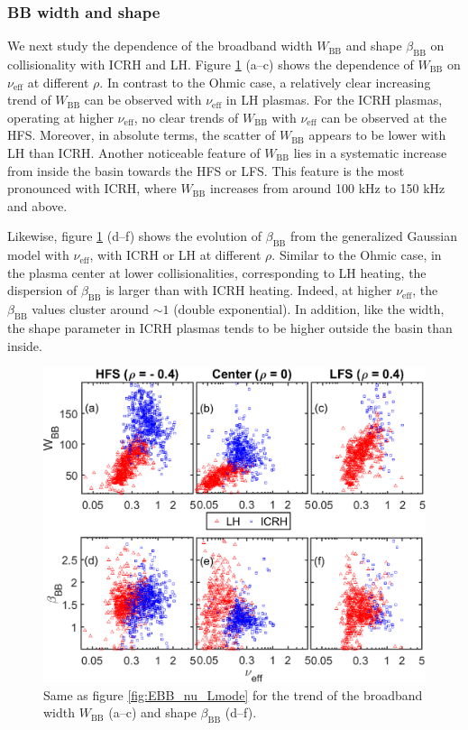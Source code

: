 \subsubsection{BB width and shape}

We next study the dependence of the broadband width $W_\mathrm{BB}$ and shape $\beta_\mathrm{BB}$ on collisionality with ICRH and LH. Figure \ref{fig:WBB_nu_Lmode} (a--c) shows the dependence of $W_\mathrm{BB}$ on $\nu_\mathrm{eff}$ at different $\rho$. In contrast to the Ohmic case, a relatively clear increasing trend of $W_\mathrm{BB}$ can be observed with $\nu_\mathrm{eff}$ in LH plasmas. For the ICRH plasmas, operating at higher $\nu_\mathrm{eff}$, no clear trends of $W_\mathrm{BB}$ with $\nu_\mathrm{eff}$ can be observed at the HFS. Moreover, in absolute terms, the scatter of $W_\mathrm{BB}$ appears to be lower with LH than ICRH. Another noticeable feature of $W_\mathrm{BB}$ lies in a systematic increase from inside the basin towards the HFS or LFS. This feature is the most pronounced with ICRH, where $W_\mathrm{BB}$ increases from around 100 kHz to 150 kHz and above.

Likewise, figure \ref{fig:WBB_nu_Lmode} (d--f) shows the evolution of $\beta_\mathrm{BB}$ from the generalized Gaussian model with $\nu_\mathrm{eff}$, with ICRH or LH at different $\rho$. Similar to the Ohmic case, in the plasma center at lower collisionalities, corresponding to LH heating, the dispersion of $\beta_\mathrm{BB}$ is larger than with ICRH heating. Indeed, at higher $\nu_\mathrm{eff}$, the $\beta_\mathrm{BB}$ values cluster around $\sim 1$ (double exponential). In addition, like the width, the shape parameter in ICRH plasmas tends to be higher outside the basin than inside.


\begin{figure}[h]
\begin{centering}
\includegraphics[scale=0.7]{fig_WBB_betaBB_nu_Lmode.eps}
\par\end{centering}
\caption{Same as figure \ref{fig:EBB_nu_Lmode} for the trend of the broadband width $W_\mathrm{BB}$ (a--c) and shape $\beta_\mathrm{BB}$ (d--f).}
\label{fig:WBB_nu_Lmode}
\end{figure}


